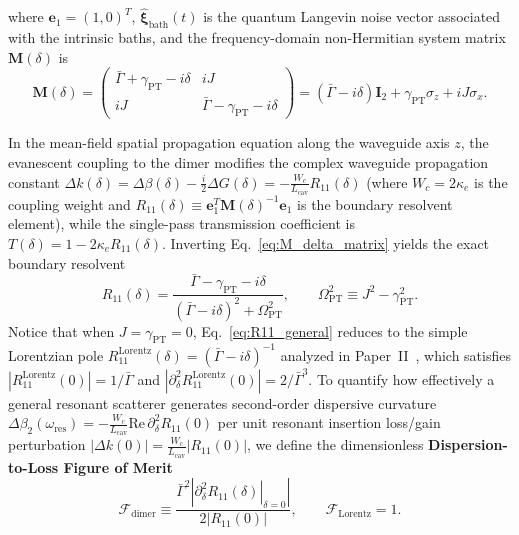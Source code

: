 \documentclass[11pt,letterpaper]{article}
\theoremstyle{definition}
\theoremstyle{remark}
\begin{document}
where $\mathbf{e}_1 = (1, 0)^T$, $\hat{\mathbf{\xi}}_{\mathrm{bath}}(t)$ is the quantum Langevin noise vector associated with the intrinsic baths, and the frequency-domain non-Hermitian system matrix $\mathbf{M}(\delta)$ is
\begin{equation}
\mathbf{M}(\delta) = \begin{pmatrix} \bar{\Gamma} + \gamma_{\mathrm{PT}} - i\delta & i J \\ i J & \bar{\Gamma} - \gamma_{\mathrm{PT}} - i\delta \end{pmatrix} = (\bar{\Gamma} - i\delta)\mathbf{I}_2 + \gamma_{\mathrm{PT}}\sigma_z + i J \sigma_x.
\label{eq:M_delta_matrix}
\end{equation}

In the mean-field spatial propagation equation along the waveguide axis $z$, the evanescent coupling to the dimer modifies the complex waveguide propagation constant $\Delta k(\delta) = \Delta\beta(\delta) - \frac{i}{2}\Delta G(\delta) = -\frac{W_c}{L_{\mathrm{cav}}} R_{11}(\delta)$ (where $W_c = 2\kappa_e$ is the coupling weight and $R_{11}(\delta) \equiv \mathbf{e}_1^T \mathbf{M}(\delta)^{-1} \mathbf{e}_1$ is the boundary resolvent element), while the single-pass transmission coefficient is $T(\delta) = 1 - 2\kappa_e R_{11}(\delta)$. Inverting Eq.~\eqref{eq:M_delta_matrix} yields the exact boundary resolvent
\begin{equation}
R_{11}(\delta) = \frac{\bar{\Gamma} - \gamma_{\mathrm{PT}} - i\delta}{(\bar{\Gamma} - i\delta)^2 + \Omega_{\mathrm{PT}}^2}, \qquad \Omega_{\mathrm{PT}}^2 \equiv J^2 - \gamma_{\mathrm{PT}}^2.
\label{eq:R11_general}
\end{equation}
Notice that when $J = \gamma_{\mathrm{PT}} = 0$, Eq.~\eqref{eq:R11_general} reduces to the simple Lorentzian pole $R_{11}^{\mathrm{Lorentz}}(\delta) = (\bar{\Gamma} - i\delta)^{-1}$ analyzed in Paper~II~\cite{OwnbyPaperII2026}, which satisfies $|R_{11}^{\mathrm{Lorentz}}(0)| = 1/\bar{\Gamma}$ and $|\partial_\delta^2 R_{11}^{\mathrm{Lorentz}}(0)| = 2/\bar{\Gamma}^3$. To quantify how effectively a general resonant scatterer generates second-order dispersive curvature $\Delta\beta_2(\omega_{\mathrm{res}}) = -\frac{W_c}{L_{\mathrm{cav}}}\mathrm{Re}\,\partial_\delta^2 R_{11}(0)$ per unit resonant insertion loss/gain perturbation $|\Delta k(0)| = \frac{W_c}{L_{\mathrm{cav}}}|R_{11}(0)|$, we define the dimensionless \textbf{Dispersion-to-Loss Figure of Merit}
\begin{equation}
\mathcal{F}_{\mathrm{dimer}} \equiv \frac{\bar{\Gamma}^2 \left|\left.\partial_\delta^2 R_{11}(\delta)\right|_{\delta=0}\right|}{2 \left|R_{11}(0)\right|}, \qquad \mathcal{F}_{\mathrm{Lorentz}} = 1.
\label{eq:fom_def}
\end{equation}
\end{document}

